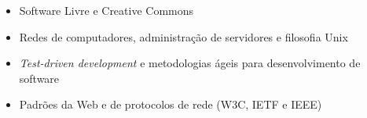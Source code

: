 \documentclass[a4paper,11pt]{article}
\begin{document}
 \begin{itemize}
  \item Software Livre e Creative Commons
  \item Redes de computadores, administração de servidores e filosofia Unix
  \item \textit{Test-driven development} e metodologias ágeis para
        desenvolvimento de software
  \item Padrões da Web e de protocolos de rede (W3C, IETF e IEEE)
 \end{itemize}
\end{document}
